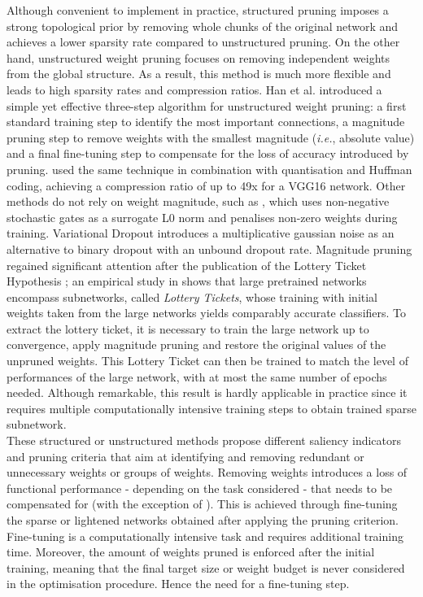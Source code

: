 Although convenient to implement in practice, structured pruning imposes a
strong topological prior by removing whole chunks of the original network and
achieves a lower sparsity rate compared to unstructured pruning. On the other
hand, unstructured weight pruning focuses on removing independent weights from
the global structure. As a result, this method is much more flexible and leads
to high sparsity rates and compression ratios. Han et al.
\cite{DBLP:conf/nips/HanPTD15} introduced a simple yet effective three-step
algorithm for unstructured weight pruning: a first standard training step to
identify the most important connections, a magnitude pruning step to remove
weights with the smallest magnitude (\emph{i.e.}, absolute value) and a final
fine-tuning step to compensate for the loss of accuracy introduced by pruning.
\cite{DBLP:journals/corr/HanMD15} used the same technique in combination with
quantisation and Huffman coding, achieving a compression ratio of up to 49x for
a VGG16 network. Other methods do not rely on weight magnitude, such as
\cite{DBLP:conf/iclr/LouizosWK18}, which uses non-negative stochastic gates as a
surrogate L0 norm and penalises non-zero weights during training. Variational
Dropout \cite{DBLP:conf/icml/MolchanovAV17} introduces a multiplicative gaussian
noise as an alternative to binary dropout
\cite{DBLP:journals/corr/abs-1207-0580,DBLP:journals/jmlr/SrivastavaHKSS14} with
an unbound dropout rate. Magnitude pruning regained significant attention after
the publication of the Lottery Ticket Hypothesis
\cite{DBLP:conf/iclr/FrankleC19}; an empirical study in
\cite{DBLP:conf/iclr/FrankleC19} shows that large pretrained networks encompass
subnetworks, called \textit{Lottery Tickets}, whose training with initial
weights taken from the large networks yields comparably accurate classifiers. To
extract the lottery ticket, it is necessary to train the large network up to
convergence, apply magnitude pruning and restore the original values of the
unpruned weights. This Lottery Ticket can then be trained to match the level of
performances of the large network, with at most the same number of epochs
needed. Although remarkable, this result is hardly applicable in practice since
it requires multiple computationally intensive training steps to obtain trained
sparse subnetwork.\\


These structured or unstructured methods propose different saliency indicators
and pruning criteria that aim at identifying and removing redundant or
unnecessary weights or groups of weights. Removing weights introduces a loss of
functional performance - depending on the task considered - that needs to be
compensated for (with the exception of \cite{DBLP:conf/icml/KangH20}). This is
achieved through fine-tuning the sparse or lightened networks obtained after
applying the pruning criterion. Fine-tuning is a computationally intensive task
and requires additional training time. Moreover, the amount of weights pruned is
enforced after the initial training, meaning that the final target size or
weight budget is never considered in the optimisation procedure. Hence the need
for a fine-tuning step. \\



